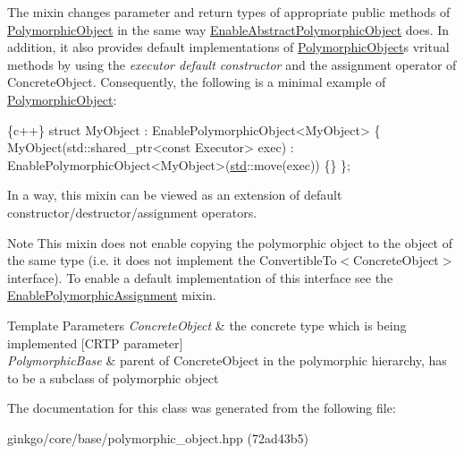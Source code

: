 The mixin changes parameter and return types of appropriate public methods of \hyperlink{classgko_1_1PolymorphicObject}{Polymorphic\+Object} in the same way \hyperlink{classgko_1_1EnableAbstractPolymorphicObject}{Enable\+Abstract\+Polymorphic\+Object} does. In addition, it also provides default implementations of \hyperlink{classgko_1_1PolymorphicObject}{Polymorphic\+Object}\textquotesingle{}s vritual methods by using the {\itshape executor default constructor} and the assignment operator of Concrete\+Object. Consequently, the following is a minimal example of \hyperlink{classgko_1_1PolymorphicObject}{Polymorphic\+Object}\+:


\begin{DoxyCode}
\{c++\}
\textcolor{keyword}{struct }MyObject : EnablePolymorphicObject<MyObject> \{
    MyObject(std::shared\_ptr<const Executor> exec)
        : EnablePolymorphicObject<MyObject>(\hyperlink{namespacestd}{std}::move(exec))
    \{\}
\};
\end{DoxyCode}


In a way, this mixin can be viewed as an extension of default constructor/destructor/assignment operators.

\begin{DoxyNote}{Note}
This mixin does not enable copying the polymorphic object to the object of the same type (i.\+e. it does not implement the Convertible\+To$<$\+Concrete\+Object$>$ interface). To enable a default implementation of this interface see the \hyperlink{classgko_1_1EnablePolymorphicAssignment}{Enable\+Polymorphic\+Assignment} mixin.
\end{DoxyNote}

\begin{DoxyTemplParams}{Template Parameters}
{\em Concrete\+Object} & the concrete type which is being implemented \mbox{[}C\+R\+TP parameter\mbox{]} \\
\hline
{\em Polymorphic\+Base} & parent of Concrete\+Object in the polymorphic hierarchy, has to be a subclass of polymorphic object \\
\hline
\end{DoxyTemplParams}


The documentation for this class was generated from the following file\+:\begin{DoxyCompactItemize}
\item 
ginkgo/core/base/polymorphic\+\_\+object.\+hpp (72ad43b5)\end{DoxyCompactItemize}
